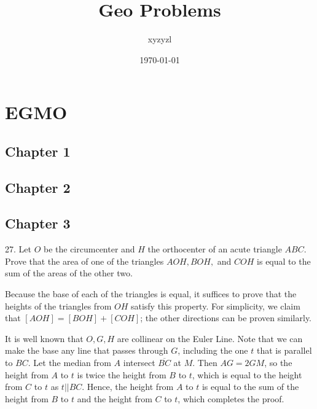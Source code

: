 \documentclass{scrartcl}
\title{Geo Problems}
\author{xyzyzl}
\date{\today}
\begin{document}
\maketitle

\section{EGMO}
\subsection{Chapter 1}

\subsection{Chapter 2}

\subsection{Chapter 3}
\begin{problem}[APMO 2004/2]
	27. Let $O$ be the circumcenter and $H$ the orthocenter of an acute triangle $ABC$. Prove that the area of one of the triangles $AOH, BOH, $ and $COH$ is equal to the sum of the areas of the other two.
\end{problem}

\begin{solution}
	Because the base of each of the triangles is equal, it suffices to prove that the heights of the triangles from $OH$ satisfy this property. For simplicity, we claim that $[AOH] = [BOH] + [COH]$; the other directions can be proven similarly.

	It is well known that $O, G, H$ are collinear on the Euler Line. Note that we can make the base any line that passes through $G$, including the one $t$ that is parallel to $BC$. Let the median from $A$ intersect $\overline{BC}$ at $M$. Then $AG = 2GM$, so the height from $A$ to $t$ is twice the height from $B$ to $t$, which is equal to the height from $C$ to $t$ as $t || BC$. Hence, the height from $A$ to $t$ is equal to the sum of the height from $B$ to $t$ and the height from $C$ to $t$, which completes the proof.
\end{solution}
\end{document}
